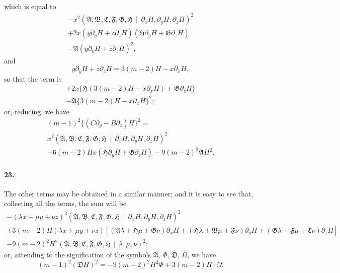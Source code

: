 \documentclass[12pt,a4paper]{article}
\theoremstyle{plain}
\begin{document}
which  is  equal  to
\begin{multline*}
-x^2 (\mathfrak{A}, \mathfrak{B}, \mathfrak{C}, \mathfrak{F}, \mathfrak{G}, \mathfrak{H} \,\!\!\mid\, \partial_x H, \partial_y H, \partial_z H)^2 \\
+ 2x (y\partial_y H + z\partial_z H)(\mathfrak{H}\partial_y H + \mathfrak{G}\partial_z H) \\
- \mathfrak{A} (y\partial_y H + z\partial_z H)^2,
\end{multline*}
and
\[
y\partial_y H + z\partial_z H = 3(m-2)H - x\partial_x H,
\]
so   that   the   term   is
\begin{multline*}
+ 2x\{\mathfrak{H}(3(m-2)H - x\partial_x H) + \mathfrak{G}\partial_z H\} \\
- \mathfrak{A}\{3(m-2)H - x\partial_x H\}^2;
\end{multline*}
or,  reducing,  we  have
\begin{multline*}
(m-1)^2 \{(C\partial_y - B\partial_z)H\}^2 = \\
x^2 (\mathfrak{A}, \mathfrak{B}, \mathfrak{C}, \mathfrak{F}, \mathfrak{G}, \mathfrak{H} \,\!\!\mid\, \partial_x H, \partial_y H, \partial_z H)^2 \\
+ 6(m-2)Hx(\mathfrak{H}\partial_y H + \mathfrak{G}\partial_z H) - 9(m-2)^2 \mathfrak{A} H^2.
\end{multline*}

\paragraph{23.}
The    other  terms  may   be   obtained   in   a   similar   manner;    and    it    is    easy    to
see  that,  collecting  all  the  terms,  the  sum  will  be
\begin{multline*}
-(\lambda x + \mu y + \nu z)^2 (\mathfrak{A}, \mathfrak{B}, \mathfrak{C}, \mathfrak{F}, \mathfrak{G}, \mathfrak{H} \,\!\!\mid\, \partial_x H, \partial_y H, \partial_z H)^2 \\
+ 3(m-2)H(\lambda x + \mu y + \nu z)
  [(\mathfrak{A}\lambda + \mathfrak{H}\mu + \mathfrak{G}\nu)\partial_x H
  + (\mathfrak{H}\lambda + \mathfrak{B}\mu + \mathfrak{F}\nu)\partial_y H
  + (\mathfrak{G}\lambda + \mathfrak{F}\mu + \mathfrak{C}\nu)\partial_z H] \\
- 9(m-2)^2 H^2 (\mathfrak{A}, \mathfrak{B}, \mathfrak{C}, \mathfrak{F}, \mathfrak{G}, \mathfrak{H} \,\!\!\mid\, \lambda, \mu, \nu)^2;
\end{multline*}
or,  attending  to  the  signification  of  the  symbols  $\mathfrak{A}$,  $\Phi$,  $\mathfrak{D}$,  $\Omega$,  we  have
\[
(m-1)^2 (\mathfrak{D} H)^2 = -9(m-2)^2 H^2 \Phi + 3(m-2)H \cdot \Omega.
\]
\end{document}
